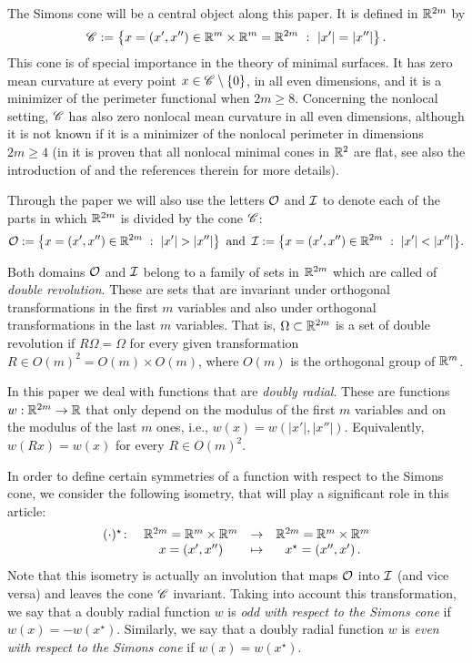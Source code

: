 The Simons cone will be a central object along this paper. It is defined in $\mathbb{R}^{2m}$ by
\begin{equation}
\label{Eq:SimonsCone}
\mathscr{C} := \left \{ x = (x', x'') \in \mathbb{R}^m \times \mathbb{R}^m=\mathbb{R}^{2m} \ : \ |x'| = |x''| \right \}.
\end{equation}
This cone is of special importance in the theory of minimal surfaces. It has zero mean curvature at every point $x\in \mathscr{C} \setminus \{0\}$, in all even dimensions, and it is a minimizer of the perimeter functional when $2m\geq 8$. Concerning the nonlocal setting, $\mathscr{C}$ has also zero nonlocal mean curvature in all even dimensions, although it is not known if it is a minimizer of the nonlocal perimeter in dimensions $2m\geq 4$ (in \cite{SavinValdinoci-Cones} it is proven that all nonlocal minimal cones in $\mathbb{R}^2$ are flat, see also the introduction of \cite{Felipe-Sanz-Perela:SaddleFractional} and the references therein for more details).

Through the paper we will also use the letters $\mathcal{O}$ and $\mathcal{I}$ to denote each of the parts in which $\mathbb{R}^{2m}$ is divided by the cone $\mathscr{C}$:
$$
\mathcal{O}:= \left \{ x = (x', x'') \in \mathbb{R}^{2m} \ : \ |x'| > |x''| \right \} \textrm{ and } \,
\mathcal{I}:= \left \{ x = (x', x'') \in \mathbb{R}^{2m} \ : \ |x'| < |x''| \right \}\!.
$$



Both domains $\mathcal{O}$ and $\mathcal{I}$ belong to a family of sets in $\mathbb{R}^{2m}$ which are called of \emph{double revolution}. These are sets that are invariant under orthogonal transformations in the first $m$ variables and also under orthogonal transformations in the last $m$ variables. That is, $\Omega\subset \mathbb{R}^{2m}$ is a set of double revolution if $R\Omega = \Omega$ for every given transformation $R\in O(m)^2 = O(m) \times O(m)$, where  $O(m)$ is the orthogonal group of $\mathbb{R}^m$.

In this paper we deal with functions that are \emph{doubly radial}. These are functions $w:\mathbb{R}^{2m}  \to \mathbb{R}$ that only depend on the modulus of the first $m$ variables and on the modulus of the last $m$ ones, i.e., $w(x) = w(|x'|,|x''|)$. Equivalently, $w(Rx) = w(x)$ for every $R \in O(m)^2$.

In order to define certain symmetries of a function with respect to the Simons cone, we consider the following isometry, that will play a significant role in this article:
\begin{equation}
\label{Eq:DefStar}
\begin{matrix}
(\cdot)^\star \colon & \mathbb{R}^{2m}= \mathbb{R}^{m}\times \mathbb{R}^{m}  &\to&  \mathbb{R}^{2m}= \mathbb{R}^{m}\times \mathbb{R}^{m}  \\
& x = (x',x'') &\mapsto & x^\star = (x'',x')\,.
\end{matrix}
\end{equation}
Note that this isometry is actually an involution that maps $\mathcal{O}$ into $\mathcal{I}$ (and vice versa) and leaves the cone $\mathscr{C}$ invariant. Taking into account this transformation, we say that a doubly radial function $w$ is \emph{odd with respect to the Simons cone} if $w(x) = -w(x^\star)$. Similarly, we say that a doubly radial function $w$ is \emph{even with respect to the Simons cone} if $w(x) = w(x^\star)$.

